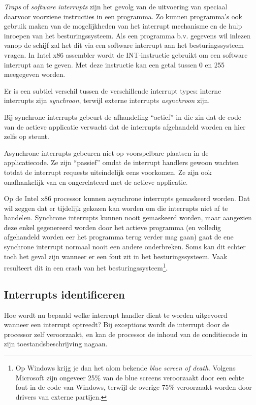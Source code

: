\emph{Traps} of \emph{software interrupts} zijn het gevolg van de uitvoering van speciaal
daarvoor voorziene instructies in een programma. Zo kunnen programma's
ook gebruik maken van de mogelijkheden van het interrupt mechanisme en
de hulp inroepen van het besturingssysteem. Als een programma b.v.
gegevens wil inlezen vanop de schijf zal het dit via een software
interrupt aan het besturingssysteem vragen. In Intel x86 assembler wordt de INT-instructie gebruikt om een
software interrupt aan te geven. Met deze instructie kan een getal
tussen 0 en 255 meegegeven worden.

Er is een subtiel verschil tussen de verschillende interrupt types: interne interrupts zijn
\emph{synchroon}, terwijl externe interrupts \emph{asynchroon} zijn.

Bij synchrone interrupts gebeurt de afhandeling ``actief'' in die zin dat de code van de
actieve applicatie verwacht dat de interrupts afgehandeld worden en hier zelfs op steunt.

Asynchrone interrupts gebeuren niet op voorspelbare plaatsen in de applicatiecode. Ze zijn
``passief'' omdat de interrupt handlers gewoon wachten totdat de interrupt requests
uiteindelijk eens voorkomen. Ze zijn ook onafhankelijk van en ongerelateerd met de actieve applicatie.

Op de Intel x86 processor kunnen asynchrone interrupts gemaskeerd worden. Dat wil zeggen
dat er tijdelijk gekozen kan worden om die interrupts niet af te handelen. Synchrone
interrupts kunnen nooit gemaskeerd worden, maar aangezien deze enkel gegenereerd worden
door het actieve programma (en volledig afgehandeld worden eer het programma terug verder mag
gaan) gaat de ene synchrone interrupt normaal nooit een andere onderbreken. Soms kan dit
echter toch het geval zijn wanneer er een fout zit in het besturingssysteem. Vaak resulteert
dit in een crash van het besturingssysteem\footnote{Op Windows krijg je dan het alom bekende
\emph{blue screen of death}. Volgens Microsoft zijn ongeveer 25\% van de blue screens veroorzaakt
door een echte fout in de code van Windows, terwijl de overige 75\% veroorzaakt worden door drivers
van externe partijen.}.

\subsection{Interrupts identificeren}

Hoe wordt nu bepaald welke interrupt handler dient te worden
uitgevoerd wanneer een interrupt optreedt? Bij exceptions wordt de
interrupt door de processor zelf veroorzaakt, en kan de processor de
inhoud van de conditiecode in zijn toestandsbeschrijving
nagaan.

